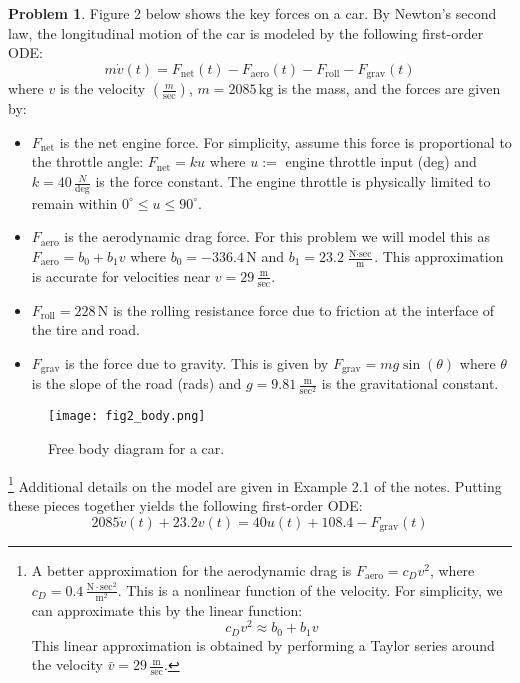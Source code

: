 \documentclass[12pt]{article}
\theoremstyle{definition}
\newtheorem{problem}{Problem}
\begin{document}
\begin{problem}
Figure 2 below shows the key forces on a car. By Newton’s second law, the longitudinal motion of the car is modeled by the following first-order ODE:
\begin{equation}
    m \dot{v}(t) = F_{\text{net}}(t) - F_{\text{aero}}(t) - F_{\text{roll}} - F_{\text{grav}}(t) \tag{5}
\end{equation}
where \( v \) is the velocity \(( \frac{m}{\text{sec}} )\), \( m = 2085 \, \text{kg} \) is the mass, and the forces are given by:
\begin{itemize}
    \item \( F_{\text{net}} \) is the net engine force. For simplicity, assume this force is proportional to the throttle angle: \( F_{\text{net}} = ku \) where \( u := \) engine throttle input (deg) and \( k = 40 \, \frac{N}{\text{deg}} \) is the force constant. The engine throttle is physically limited to remain within \( 0^\circ \leq u \leq 90^\circ \).
    \item \( F_{\text{aero}} \) is the aerodynamic drag force. For this problem we will model this as \( F_{\text{aero}} = b_0 + b_1 v \) where \( b_0 = -336.4 \, \text{N} \) and \( b_1 = 23.2 \, \frac{\text{N} \cdot \text{sec}}{\text{m}} \). This approximation is accurate for velocities near \( v = 29 \, \frac{\text{m}}{\text{sec}} \).
    \item \( F_{\text{roll}} = 228 \, \text{N} \) is the rolling resistance force due to friction at the interface of the tire and road.
    \item \( F_{\text{grav}} \) is the force due to gravity. This is given by \( F_{\text{grav}} = mg \sin(\theta) \) where \( \theta \) is the slope of the road (rads) and \( g = 9.81 \, \frac{\text{m}}{\text{sec}^2} \) is the gravitational constant.
\end{itemize}

\begin{figure}[h!]
    \centering
    \texttt{[image: fig2\_body.png]}
    \caption{Free body diagram for a car.}
\end{figure}

\footnote{
\noindent A better approximation for the aerodynamic drag is \( F_{\text{aero}} = c_D v^2 \), where \( c_D = 0.4 \, \frac{\text{N} \cdot \text{sec}^2}{\text{m}^2} \). This is a nonlinear function of the velocity. For simplicity, we can approximate this by the linear function:
\[
c_D v^2 \approx b_0 + b_1 v
\]
This linear approximation is obtained by performing a Taylor series around the velocity \( \bar{v} = 29 \, \frac{\text{m}}{\text{sec}} \).
}
Additional details on the model are given in Example 2.1 of the notes. Putting these pieces together yields the following first-order ODE:
\begin{equation}
    2085 \dot{v}(t) + 23.2 v(t) = 40 u(t) + 108.4 - F_{\text{grav}}(t) \tag{6}
\end{equation}


\end{problem}
\end{document}
